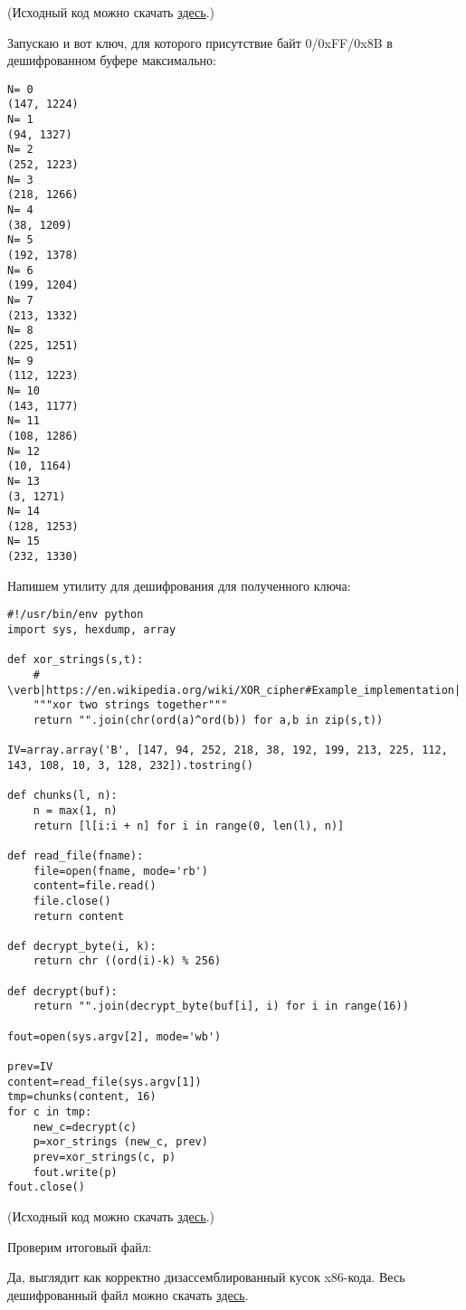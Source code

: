 (Исходный код можно скачать \href{\RepoURL/examples/simple_exec_crypto/files/decrypt.py}{здесь}.)

Запускаю и вот ключ, для которого присутствие байт 0/0xFF/0x8B в дешифрованном буфере максимально:

\begin{lstlisting}
N= 0
(147, 1224)
N= 1
(94, 1327)
N= 2
(252, 1223)
N= 3
(218, 1266)
N= 4
(38, 1209)
N= 5
(192, 1378)
N= 6
(199, 1204)
N= 7
(213, 1332)
N= 8
(225, 1251)
N= 9
(112, 1223)
N= 10
(143, 1177)
N= 11
(108, 1286)
N= 12
(10, 1164)
N= 13
(3, 1271)
N= 14
(128, 1253)
N= 15
(232, 1330)
\end{lstlisting}

Напишем утилиту для дешифрования для полученного ключа:

\begin{lstlisting}[style=custompy]
#!/usr/bin/env python
import sys, hexdump, array

def xor_strings(s,t):
    # \verb|https://en.wikipedia.org/wiki/XOR_cipher#Example_implementation|
    """xor two strings together"""
    return "".join(chr(ord(a)^ord(b)) for a,b in zip(s,t))

IV=array.array('B', [147, 94, 252, 218, 38, 192, 199, 213, 225, 112, 143, 108, 10, 3, 128, 232]).tostring()

def chunks(l, n):
    n = max(1, n)
    return [l[i:i + n] for i in range(0, len(l), n)]

def read_file(fname):
    file=open(fname, mode='rb')
    content=file.read()
    file.close()
    return content

def decrypt_byte(i, k):
    return chr ((ord(i)-k) % 256)

def decrypt(buf):
    return "".join(decrypt_byte(buf[i], i) for i in range(16))

fout=open(sys.argv[2], mode='wb')

prev=IV
content=read_file(sys.argv[1])
tmp=chunks(content, 16)
for c in tmp:
    new_c=decrypt(c)
    p=xor_strings (new_c, prev)
    prev=xor_strings(c, p)
    fout.write(p)
fout.close()
\end{lstlisting}

(Исходный код можно скачать \href{\RepoURL/examples/simple_exec_crypto/files/decrypt2.py}{здесь}.)

Проверим итоговый файл:



Да, выглядит как корректно дизассемблированный кусок x86-кода.
Весь дешифрованный файл можно скачать \href{\RepoURL/examples/simple_exec_crypto/files/decrypted.bin}{здесь}.


